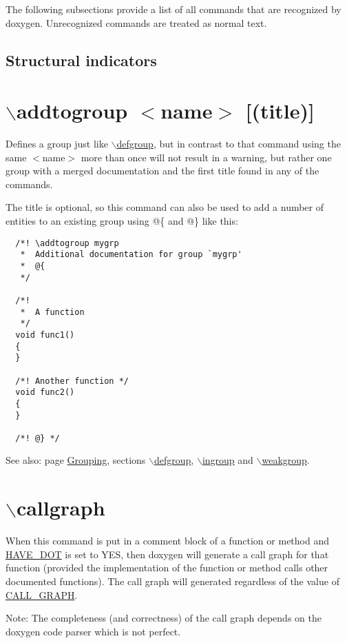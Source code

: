 The following subsections provide a list of all commands that are recognized by doxygen. Unrecognized commands are treated as normal text.

\subsection*{ Structural indicators }\hypertarget{commands_cmdaddtogroup}{}\section{$\backslash$addtogroup $<$name$>$ \mbox{[}(title)\mbox{]}}\label{commands_cmdaddtogroup}
 Defines a group just like \hyperlink{commands_cmddefgroup}{$\backslash$defgroup}, but in contrast to that command using the same $<$name$>$ more than once will not result in a warning, but rather one group with a merged documentation and the first title found in any of the commands.

The title is optional, so this command can also be used to add a number of entities to an existing group using @\{ and @\} like this:



\footnotesize\begin{verbatim}
  /*! \addtogroup mygrp
   *  Additional documentation for group `mygrp'
   *  @{
   */

  /*!
   *  A function 
   */
  void func1()
  {
  }

  /*! Another function */
  void func2()
  {
  }

  /*! @} */
\end{verbatim}
\normalsize


\begin{Desc}
\item[See also:]page \hyperlink{grouping}{Grouping}, sections \hyperlink{commands_cmddefgroup}{$\backslash$defgroup}, \hyperlink{commands_cmdingroup}{$\backslash$ingroup} and \hyperlink{commands_cmdweakgroup}{$\backslash$weakgroup}.\end{Desc}
\hypertarget{commands_cmdcallgraph}{}\section{$\backslash$callgraph}\label{commands_cmdcallgraph}
 When this command is put in a comment block of a function or method and \hyperlink{config_cfg_have_dot}{HAVE\_\-DOT} is set to YES, then doxygen will generate a call graph for that function (provided the implementation of the function or method calls other documented functions). The call graph will generated regardless of the value of \hyperlink{config_cfg_call_graph}{CALL\_\-GRAPH}. \begin{Desc}
\item[Note:]The completeness (and correctness) of the call graph depends on the doxygen code parser which is not perfect.\end{Desc}


